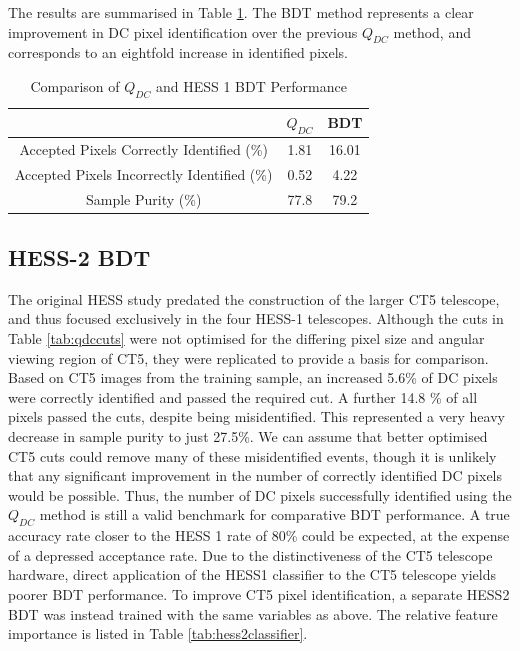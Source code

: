 \documentclass[11pt]{article}
\begin{document}
The results are summarised in Table \ref{tab:qdcbdtcomparison1}. The BDT method represents a clear improvement in DC pixel identification over the previous $Q_{DC}$ method, and corresponds to an eightfold increase in identified pixels. 

\begin{table}[h!]
  \centering
  \caption{Comparison of $Q_{DC}$ and HESS 1 BDT Performance}
  \label{tab:qdcbdtcomparison1}
  \begin{tabular}{ccc}
    \toprule
    & $Q_{DC}$ & BDT\\
    \midrule
    Accepted Pixels Correctly Identified (\%)  & 1.81 & 16.01\\
   Accepted Pixels Incorrectly Identified (\%)  & 0.52& 4.22\\
    Sample Purity (\%)  & 77.8 & 79.2 \\
    \bottomrule
  \end{tabular}
\end{table}

\subsection{HESS-2 BDT}
The original HESS study predated the construction of the larger CT5 telescope, and thus focused exclusively in the four HESS-1 telescopes. Although the cuts in Table \ref{tab:qdccuts} were not optimised for the differing pixel size and angular viewing region of CT5, they were replicated to provide a basis for comparison. Based on CT5 images from the training sample, an increased 5.6\% of DC pixels were correctly identified and passed the required cut. A further 14.8 \% of all pixels passed the cuts, despite being misidentified. This represented a very heavy decrease in sample purity to just 27.5\%. We can assume that better optimised CT5 cuts could remove many of these misidentified events, though it is unlikely that any significant improvement in the number of correctly identified DC pixels would be possible. Thus, the number of DC pixels successfully identified using the $Q_{DC}$ method is still a valid benchmark for comparative BDT performance. A true accuracy rate closer to the HESS 1 rate of 80\% could be expected, at the expense of a depressed acceptance rate. Due to the distinctiveness of the CT5 telescope hardware, direct application of the HESS1 classifier to the CT5 telescope yields poorer BDT performance. To improve CT5 pixel identification, a separate HESS2 BDT was instead trained with the same variables as above. The relative feature importance is listed in Table \ref{tab:hess2classifier}. 
\end{document}
